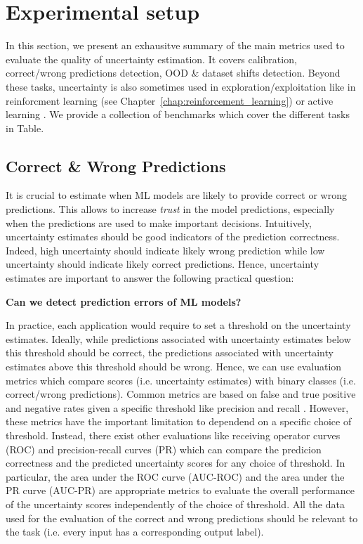 
\section{Experimental setup}

In this section, we present an exhausitve summary of the main metrics used to evaluate the quality of uncertainty estimation. 
It covers calibration, correct/wrong predictions detection, OOD \& dataset shifts detection.
Beyond these tasks, uncertainty is also sometimes used in exploration/exploitation like in reinforcment learning (see Chapter~\ref{chap:reinforcement_learning}) or active learning .
We provide a collection of benchmarks which cover the different tasks in Table.~


\subsection{Correct \& Wrong Predictions}

It is crucial to estimate when ML models are likely to provide correct or wrong predictions. This allows to increase \emph{trust} in the model predictions, especially when the predictions are used to make important decisions. Intuitively, uncertainty estimates should be good indicators of the prediction correctness. Indeed, high uncertainty should indicate likely wrong prediction while low uncertainty should indicate likely correct predictions. Hence, uncertainty estimates are important to answer the following practical question:

\begin{center}
    \textbf{Can we detect prediction errors of ML models?}
\end{center}

In practice, each application would require to set a threshold on the uncertainty estimates. Ideally, while predictions associated with uncertainty estimates below this threshold should be correct, the predictions associated with uncertainty estimates above this threshold should be wrong. Hence, we can use evaluation metrics which compare scores (i.e. uncertainty estimates) with binary classes (i.e. correct/wrong predictions). Common metrics are based on false and true positive and negative rates given a specific threshold like precision and recall . However, these metrics have the important limitation to dependend on a specific choice of threshold. Instead, there exist other evaluations like receiving operator curves (ROC) and precision-recall curves (PR) which can compare the predicion correctness and the predicted uncertainty scores for any choice of threshold. In particular, the area under the ROC curve (AUC-ROC) and the area under the PR curve (AUC-PR)  are appropriate metrics to evaluate the overall performance of the uncertainty scores independently of the choice of threshold. All the data used for the evaluation of the correct and wrong predictions should be relevant to the task (i.e. every input has a corresponding output label).

